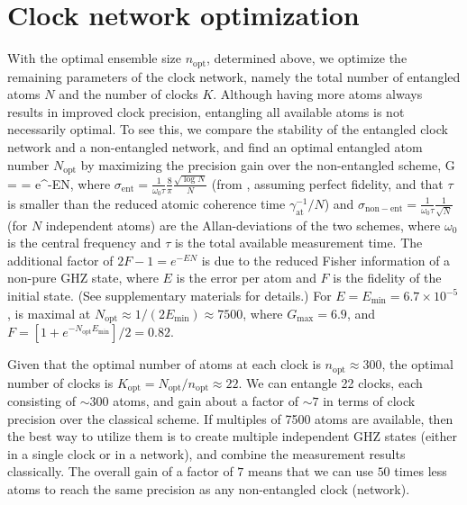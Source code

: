 \section{Clock network optimization}
With the optimal ensemble size $n_\mathrm{opt}$, determined above, we optimize the
remaining parameters of the clock network, namely the total number of entangled
atoms $N$ and the number of clocks $K$. Although having more atoms always
results in improved clock precision, entangling all available atoms is not
necessarily optimal. To see this, we compare the stability of the entangled
clock network and a non-entangled network, and find an optimal entangled atom
number $N_\mathrm{opt}$ by maximizing the precision gain over the non-entangled
scheme,
\bel
\label{eq:gain}
	G =  =
	e^{-EN},
\eel 
where $\sigma_\mathrm{ent} = \frac{1}{\omega_0 \tau}\frac{8}{\pi}\frac{\sqrt{\log
N}}{N}$ (from \cite{Komar2014}, assuming perfect fidelity, and that $\tau$ is
smaller than the reduced atomic coherence time $\gamma_\mathrm{at}^{-1}/N$) and
$\sigma_\mathrm{non-ent} = \frac{1}{\omega_0\tau}\frac{1}{\sqrt{N}}$ (for $N$
independent atoms) are the Allan-deviations of the two schemes, where $\omega_0$
is the central frequency and $\tau$ is the total available measurement time.
The additional factor of $2F-1 = e^{-EN}$ is due to the reduced Fisher
information of a non-pure GHZ state, where $E$ is the error per atom and $F$
is the fidelity of the initial state.
(See supplementary materials for details.) For $E = E_\mathrm{min} = 6.7\times
10^{-5}$,  is maximal at $N_\mathrm{opt} \approx
1/(2E_\mathrm{min}) \approx 7500$, where $G_\mathrm{max} = 6.9$, and $F =
[1+e^{-N_\mathrm{opt} E_\mathrm{min}}]/2 = 0.82$.

Given that the optimal number of atoms at each clock is $n_\mathrm{opt} \approx
300$, the optimal number of clocks is $K_\mathrm{opt} = N_\mathrm{opt} /
n_\mathrm{opt} \approx 22$. We can entangle 22 clocks, each consisting of $\sim
300$ atoms, and gain about  a factor of $\sim 7$ in terms of clock precision
over the classical scheme. If multiples of 7500 atoms are available, then the
best way to utilize them is to create multiple independent GHZ states (either in
a single clock or in a network), and combine the measurement results
classically. The overall gain of a factor of $7$ means that we can use $50$
times less atoms to reach the same precision as any non-entangled clock
(network). 

